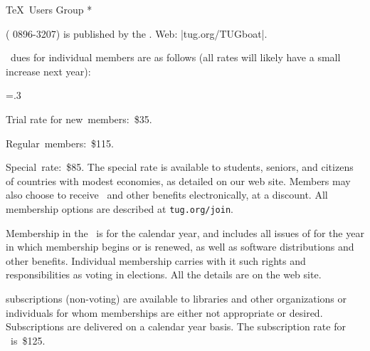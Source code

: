 


\TUBfinal

\def\rateyear{\the\year}
\def\tug{\acro{TUG}}
\def\rtitle{}

\def\USA{U\kern-.12em.\kern.04em S\kern-.06em.\kern.06em A\null.}

\head * \TeX\ Users Group *

\TUB\/ ( 0896-3207) is published by the\newline
\TUG{}. Web: |tug.org/TUGboat|.

\bigskip {}

\noindent
\rateyear\ dues for individual members are as follows
(all rates will likely have a small increase next year):

\begingroup
\raggedstretch=.3\colwd
\raggedright
{}
\item{\bull} Trial rate for new~members:~\$35.
\item{\bull} Regular~members:~\$115.
\item{\bull} Special~rate:~\$85.
\unskip\endgraf
\endgroup       %
\noindent The special rate is available to students, seniors, and
citizens of countries with modest economies, as detailed on our web
site.
Members may also choose to receive \TUB\ and other benefits
electronically, at a discount. All membership options are described at
{\tt tug.org/join}.

Membership in the \TUG\ is for the calendar year, and includes all issues
of \TUB\/ for the year in which membership begins or is renewed, as well
as software distributions and other benefits.
Individual membership carries with
it such rights and responsibilities as voting in  elections.
All the details are on the  web site.

\bigskip {}

\noindent \TUB\/ subscriptions (non-voting) are available to libraries
and other organizations or individuals for whom 
memberships are either not appropriate or desired.
Subscriptions are delivered on a calendar year basis.
The subscription rate for
\rateyear\ is~\$125.

